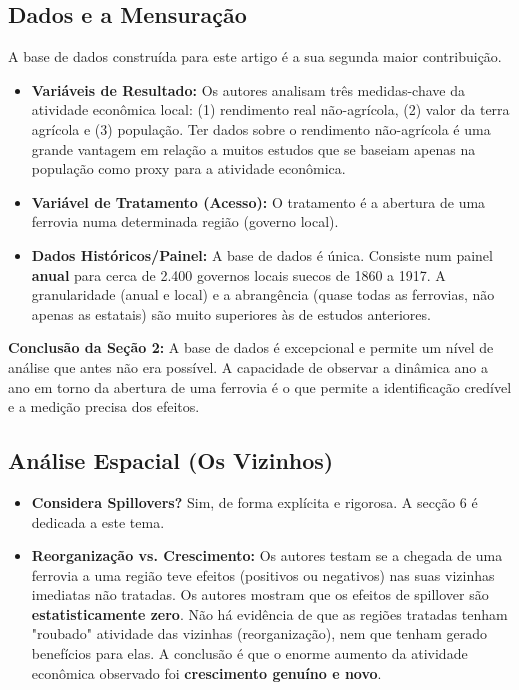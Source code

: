 \documentclass[12pt, a4paper]{article}
\begin{document}
\subsection{Dados e a Mensuração}
A base de dados construída para este artigo é a sua segunda maior contribuição.
\begin{itemize}
    \item \textbf{Variáveis de Resultado:} Os autores analisam três medidas-chave da atividade econômica local: (1) rendimento real não-agrícola, (2) valor da terra agrícola e (3) população. Ter dados sobre o rendimento não-agrícola é uma grande vantagem em relação a muitos estudos que se baseiam apenas na população como proxy para a atividade econômica.
    \item \textbf{Variável de Tratamento (Acesso):} O tratamento é a abertura de uma ferrovia numa determinada região (governo local).
    \item \textbf{Dados Históricos/Painel:} A base de dados é única. Consiste num painel \textbf{anual} para cerca de 2.400 governos locais suecos de 1860 a 1917. A granularidade (anual e local) e a abrangência (quase todas as ferrovias, não apenas as estatais) são muito superiores às de estudos anteriores.
\end{itemize}

\noindent\textbf{Conclusão da Seção 2:} A base de dados é excepcional e permite um nível de análise que antes não era possível. A capacidade de observar a dinâmica ano a ano em torno da abertura de uma ferrovia é o que permite a identificação credível e a medição precisa dos efeitos.

\subsection{Análise Espacial (Os Vizinhos)}

\begin{itemize}
    \item \textbf{Considera Spillovers?} Sim, de forma explícita e rigorosa. A secção 6 é dedicada a este tema.
    \item \textbf{Reorganização vs. Crescimento:} Os autores testam se a chegada de uma ferrovia a uma região teve efeitos (positivos ou negativos) nas suas vizinhas imediatas não tratadas. Os autores mostram que os efeitos de spillover são \textbf{estatisticamente zero}. Não há evidência de que as regiões tratadas tenham "roubado" atividade das vizinhas (reorganização), nem que tenham gerado benefícios para elas. A conclusão é que o enorme aumento da atividade econômica observado foi \textbf{crescimento genuíno e novo}.
\end{itemize}
\end{document}
